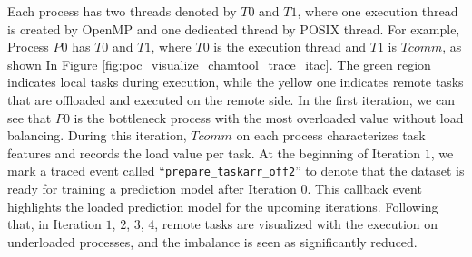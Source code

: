 Each process has two threads denoted by $T0$ and $T1$, where one execution thread is created by OpenMP and one dedicated thread by POSIX thread. For example, Process $P0$ has $T0$ and $T1$, where $T0$ is the execution thread and $T1$ is $Tcomm$, as shown In Figure \ref{fig:poc_visualize_chamtool_trace_itac}. The green region indicates local tasks during execution, while the yellow one indicates remote tasks that are offloaded and executed on the remote side. In the first iteration, we can see that $P0$ is the bottleneck process with the most overloaded value without load balancing. During this iteration, $Tcomm$ on each process characterizes task features and records the load value per task. At the beginning of Iteration $1$, we mark a traced event called ``\texttt{prepare\_taskarr\_off2}'' to denote that the dataset is ready for training a prediction model after Iteration $0$. This callback event highlights the loaded prediction model for the upcoming iterations. Following that, in Iteration $1$, $2$, $3$, $4$, remote tasks are visualized with the execution on underloaded processes, and the imbalance is seen as significantly reduced.